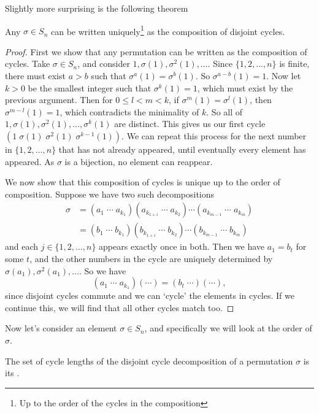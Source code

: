 \documentclass[a4paper]{scrartcl}
\begin{document}
Slightly more surprising is the following theorem
\begin{theorem}
	Any $\sigma \in S_n$ can be written uniquely\footnote{Up to the order of the cycles in the composition} as the composition of disjoint cycles.
\end{theorem}
\begin{proof}
	First we show that any permutation can be written as the composition of cycles.
	Take $\sigma \in S_n$, and consider $1, \sigma(1), \sigma^2(1), \dots$. Since $\{1, 2, \dots, n\}$ is finite, there must exist $a > b$ such that $\sigma^a(1) = \sigma^b(1)$. So $\sigma^{a -b}(1) = 1$. Now let $k > 0$ be the smallest integer such that $\sigma^k(1) = 1$, which must exist by the previous argument. Then for $0 \leq l < m < k$, if $\sigma^m(1) = \sigma^l(1)$, then $\sigma^{m - l}(1) = 1$, which contradicts the minimality of $k$. So all of $1, \sigma(1), \sigma^2(1), \dots, \sigma^k(1)$ are distinct. This gives us our first cycle $(1\; \sigma(1)\; \sigma^2(1)\; \sigma^{k - 1}(1))$.
	We can repeat this process for the next number in $\{1, 2, \dots, n\}$ that has not already appeared, until eventually every element has appeared. As $\sigma$ is a bijection, no element can reappear.

	We now show that this composition of cycles is unique up to the order of composition. Suppose we have two such decompositions
	\begin{align*}
		\sigma &= (a_1 \; \cdots \; a_{k_1}) (a_{k_{1 + i}} \; \cdots \; a_{k_2}) \cdots (a_{k_{m - 1}} \; \cdots \; a_{k_m})\\
		  &= (b_1 \; \cdots \; b_{k_1}) (b_{k_{1 + i}} \; \cdots \; b_{k_2}) \cdots (b_{k_{m - 1}} \; \cdots \; b_{k_m})
	\end{align*}
	and each $j \in \{1, 2, \dots, n\}$ appears exactly once in both. Then we have $a_1 = b_t$ for some $t$, and the other numbers in the cycle are uniquely determined by $\sigma(a_1), \sigma^2(a_1), \dots$. So we have
	$$
	(a_1\; \cdots\; a_{k_1}) (\cdots) = (b_t\; \cdots)(\cdots),
	$$
	since disjoint cycles commute and we can `cycle' the elements in cycles. If we continue this, we will find that all other cycles match too.
\end{proof}

Now let's consider an element $\sigma \in S_n$, and specifically we will look at the order of $\sigma$.

\begin{definition}
	The set of cycle lengths of the disjoint cycle decomposition of a permutation $\sigma$ is its .
\end{definition}
\end{document}
